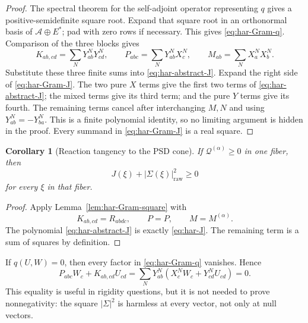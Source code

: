 \documentclass[10pt]{coll-l}
\newtheorem{corollary}[theorem]{Corollary}
\theoremstyle{definition}
\theoremstyle{remark}
\numberwithin{section}{chapter}
\numberwithin{equation}{chapter}
\begin{document}
\begin{proof}
The spectral theorem for the self-adjoint operator representing $q$ gives a
positive-semidefinite square root.  Expand that square root in an
orthonormal basis of $\mathcal A\oplus E^*$; pad with zero rows if necessary.
This gives \eqref{eq:har-Gram-q}.  Comparison of the three blocks gives
\begin{equation}
 K_{ab,cd}=\sum_NY^N_{ab}Y^N_{cd},\qquad
 P_{abc}=\sum_NY^N_{ab}X^N_c,\qquad
 M_{ab}=\sum_NX^N_aX^N_b.                              \label{eq:har-Gram-blocks}
\end{equation}
Substitute these three finite sums into \eqref{eq:har-abstract-J}.  Expand
the right side of \eqref{eq:har-Gram-J}.  The two pure $X$ terms give the
first two terms of \eqref{eq:har-abstract-J}; the mixed terms give its third
term; and the pure $Y$ terms give its fourth.  The remaining terms cancel
after interchanging $M,N$ and using $Y^N_{ab}=-Y^N_{ba}$.  This is a finite
polynomial identity, so no limiting argument is hidden in the proof.
Every summand in \eqref{eq:har-Gram-J} is a real square.
\end{proof}

\begin{corollary}[Reaction tangency to the PSD cone]
\label{cor:har-reaction-tangent}
If $\mathscr Q^{(\alpha)}\geq0$ in one fiber, then
\begin{equation}
 J(\xi)+|\Sigma(\xi)|_{\mathrm{raw}}^2\geq0             \label{eq:har-reaction-nonnegative}
\end{equation}
for every $\xi$ in that fiber.
\end{corollary}

\begin{proof}
Apply Lemma~\ref{lem:har-Gram-square} with
\[
        K_{ab,cd}=R_{abdc},\qquad P=P,\qquad M=M^{(\alpha)}.
\]
The polynomial \eqref{eq:har-abstract-J} is exactly
\eqref{eq:har-J}.  The remaining term is a sum of squares by definition.
\end{proof}

If $q(U,W)=0$, then every factor in \eqref{eq:har-Gram-q} vanishes.  Hence
\begin{equation}
 P_{abc}W_c+K_{ab,cd}U_{cd}
 =\sum_NY^N_{ab}(X^N_cW_c+Y^N_{cd}U_{cd})=0.            \label{eq:har-null-Sigma}
\end{equation}
This equality is useful in rigidity questions, but it is not needed to
prove nonnegativity: the square $|\Sigma|^2$ is harmless at every vector,
not only at null vectors.
\end{document}
